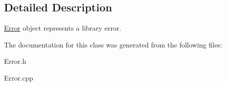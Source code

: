 \subsection{\-Detailed \-Description}
\hyperlink{classError}{\-Error} object represents a library error. 

\-The documentation for this class was generated from the following files\-:\begin{DoxyCompactItemize}
\item 
\-Error.\-h\item 
\-Error.\-cpp\end{DoxyCompactItemize}
